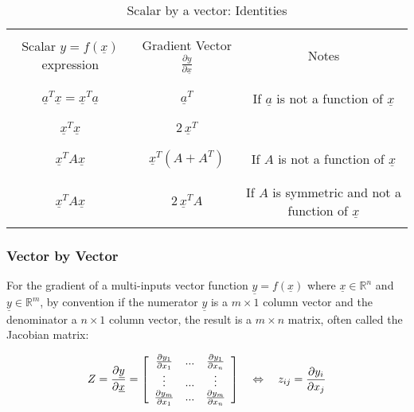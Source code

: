 \begin{table}[H]
\centering
\caption{ Scalar by a vector: Identities}
\label{scavec}
 \begin{tabular}{ | c | c | c |}
 \hline \hline & & \\
 Scalar $y = f(\underline{x})$ expression & Gradient Vector $\frac{\partial y}{\partial \underline{x}}$  & Notes \\ & & \\
 \hline \hline & & \\
 $ \underline{a}^T \underline{x} = \underline{x}^T \underline{a} $ & 
 $\underline{a}^T$ &   If $\underline{a}$ is not a function of $\underline{x}$
 \\ & & \\
  \hline & & \\
 $ \underline{x}^T \underline{x} $ & 
 $ 2 \, \underline{x}^T $ &   
 \\ & & \\
 \hline & & \\
 $ \underline{x}^T A \underline{x} $ & 
 $\underline{x}^T ( A + A^T )$ &   If $A$ is not a function of $\underline{x}$
 \\ & & \\
 \hline & & \\
 $ \underline{x}^T A \underline{x} $ & 
 $ 2\, \underline{x}^T A$ &   If $A$ is symmetric and not a function of $\underline{x}$
 \\ & & \\
 \hline
 \end{tabular}
\end{table}

\subsubsection{Vector by Vector}
For the gradient of a multi-inputs vector function $\underline{y} = f(\underline{x})$ where $\underline{x} \in \mathbb{R}^n$ and $\underline{y} \in \mathbb{R}^m$, by convention if the numerator $\underline{y}$ is a $m \times 1$ column vector and the denominator a $n \times 1$ column vector, the result is a $m \times n$ matrix, often called the Jacobian matrix:

\begin{align}
Z = \frac{\partial \underline{y}}{\partial \underline{x}} =  
\left[ \begin{array}{c c c } 
  \frac{\partial y_1}{\partial x_{1}}   & ... & \frac{\partial y_1}{\partial x_{n}} \\
  \vdots                             & ... & \vdots                          \\
  \frac{\partial y_m}{\partial x_{1}}   & ... & \frac{\partial y_m}{\partial x_{n}} \\
 \end{array} \right]
 \quad\Leftrightarrow\quad
  z_{ij} = \frac{\partial y_i}{\partial x_j}
\end{align}

